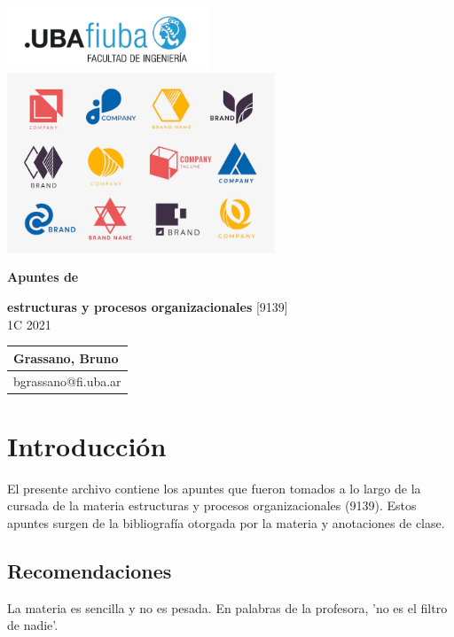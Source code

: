 \documentclass[titlepage,a4paper]{article}
\begin{document}
\begin{titlepage} %
	\hfill\includegraphics[width=6cm]{logofiuba.jpg}
    \centering
    \vfill
    \includegraphics[width=8cm]{imagenes/logos.jpg}
    
    \Huge \textbf{Apuntes de} 
    
    \Huge \textbf{estructuras y procesos organizacionales}
    \vskip2cm
    \Large [9139]\\
    1C 2021
    \vfill
    \begin{tabular}{ | l | } %
      \hline
      Grassano, Bruno \\ \hline
      bgrassano@fi.uba.ar \\ \hline
  	\end{tabular}
    \vfill
    \vfill
\end{titlepage}

\tableofcontents %

\newpage

\section{Introducción}\label{sec:intro}
El presente archivo contiene los apuntes que fueron tomados a lo largo de la cursada de la materia estructuras y procesos organizacionales (9139). Estos apuntes surgen de la bibliografía otorgada por la materia y anotaciones de clase. 

\subsection*{Recomendaciones}

La materia es sencilla y no es pesada. En palabras de la profesora, 'no es el filtro de nadie'. 
\end{document}
